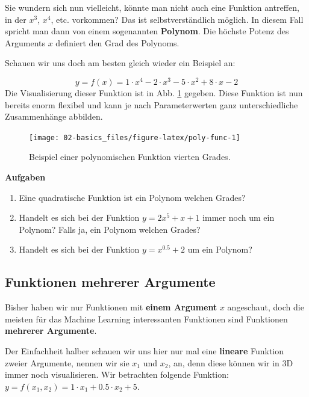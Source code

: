 \documentclass[
]{book}
\providecommand{\tightlist}{%
  \setlength{\itemsep}{0pt}\setlength{\parskip}{0pt}}
\begin{document}
Sie wundern sich nun vielleicht, könnte man nicht auch eine Funktion antreffen, in der \(x^3\), \(x^4\), etc. vorkommen? Das ist selbstverständlich möglich. In diesem Fall spricht man dann von einem sogenannten \textbf{Polynom}. Die höchste Potenz des Arguments \(x\) definiert den Grad des Polynoms.

Schauen wir uns doch am besten gleich wieder ein Beispiel an:

\[
y = f(x) = 1 \cdot x^4 - 2 \cdot x^3 - 5 \cdot x^2 + 8 \cdot x - 2
\]
Die Visualisierung dieser Funktion ist in Abb. \ref{fig:poly-func} gegeben. Diese Funktion ist nun bereits enorm flexibel und kann je nach Parameterwerten ganz unterschiedliche Zusammenhänge abbilden.

\begin{figure}

{\centering \texttt{[image: 02-basics\_files/figure-latex/poly-func-1]} 

}

\caption{Beispiel einer polynomischen Funktion vierten Grades.}\label{fig:poly-func}
\end{figure}

\textbf{Aufgaben}

\begin{enumerate}
\def\labelenumi{\arabic{enumi}.}
\tightlist
\item
  Eine quadratische Funktion ist ein Polynom welchen Grades?
\item
  Handelt es sich bei der Funktion \(y=2x^5 + x + 1\) immer noch um ein Polynom? Falls ja, ein Polynom welchen Grades?
\item
  Handelt es sich bei der Funktion \(y = x^{0.5} + 2\) um ein Polynom?
\end{enumerate}

\hypertarget{funktionen-mehrerer-argumente}{%
\subsection{Funktionen mehrerer Argumente}\label{funktionen-mehrerer-argumente}}

Bisher haben wir nur Funktionen mit \textbf{einem Argument} \(x\) angeschaut, doch die meisten für das Machine Learning interessanten Funktionen sind Funktionen \textbf{mehrerer Argumente}.

Der Einfachheit halber schauen wir uns hier nur mal eine \textbf{lineare} Funktion zweier Argumente, nennen wir sie \(x_1\) und \(x_2\), an, denn diese können wir in 3D immer noch visualisieren. Wir betrachten folgende Funktion: \(y = f(x_1,x_2) = 1 \cdot x_1 + 0.5 \cdot x_2 + 5\).
\end{document}
